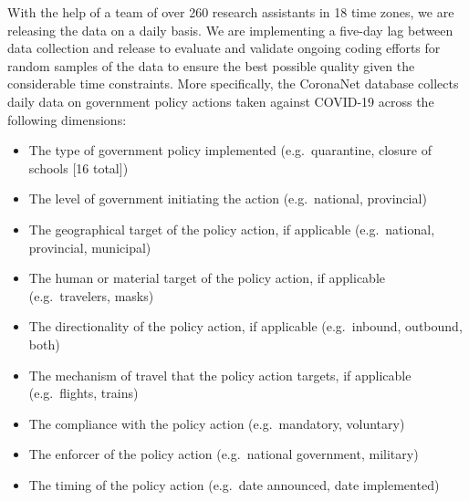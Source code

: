 \documentclass[
]{article}
\providecommand{\tightlist}{%
  \setlength{\itemsep}{0pt}\setlength{\parskip}{0pt}}
\begin{document}
With the help of a team of over 260 research assistants in 18 time zones, we are releasing the data on a daily basis. We are implementing a five-day lag between data collection and release to evaluate and validate ongoing coding efforts for random samples of the data to ensure the best possible quality given the considerable time constraints. More specifically, the CoronaNet database collects daily data on government policy actions taken against COVID-19 across the following dimensions:

\begin{itemize}
\tightlist
\item
  The type of government policy implemented (e.g.~quarantine, closure of schools {[}16 total{]})
\item
  The level of government initiating the action (e.g.~national, provincial)
\item
  The geographical target of the policy action, if applicable (e.g.~national, provincial, municipal)
\item
  The human or material target of the policy action, if applicable (e.g.~travelers, masks)
\item
  The directionality of the policy action, if applicable (e.g.~inbound, outbound, both)
\item
  The mechanism of travel that the policy action targets, if applicable (e.g.~flights, trains)
\item
  The compliance with the policy action (e.g.~mandatory, voluntary)
\item
  The enforcer of the policy action (e.g.~national government, military)
\item
  The timing of the policy action (e.g.~date announced, date implemented)
\end{itemize}
\end{document}
